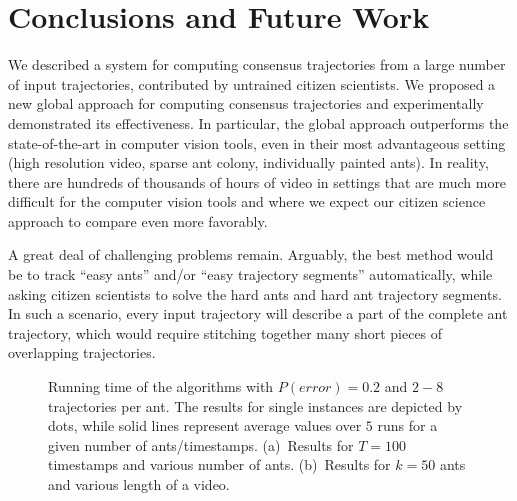 \documentclass{llncs}
\begin{document}
\section{Conclusions and Future Work}
\label{sect:open}
We described a system for computing consensus trajectories
from a large number of  input trajectories,
contributed by untrained citizen scientists.
We proposed a new global approach for computing consensus
trajectories and
experimentally demonstrated its effectiveness.
In particular, the global approach outperforms the state-of-the-art in
computer vision tools, even in their most advantageous setting (high
resolution video, sparse ant colony, individually painted ants).
In reality, there are hundreds of thousands of hours of video in settings
that are much more difficult for the computer vision tools and where
we expect our citizen science approach to compare even more
favorably.


A great deal of challenging problems remain. Arguably, the best method
would be to track ``easy ants'' and/or ``easy trajectory segments''
automatically, while asking citizen scientists to solve the hard ants
and hard ant trajectory segments. In such a scenario, every input
trajectory will describe a part of the complete ant trajectory, which
would require stitching together many short
pieces of overlapping trajectories.

\begin{figure}[t]
    \center
\hfill
    \caption{Running time of the algorithms with $P(error)=0.2$ and $2-8$ trajectories per ant.
    The results for single instances are depicted by dots, while solid lines represent average values over $5$ runs
    for a given number of ants/timestamps.
    (a)~Results for $T=100$ timestamps and various number of ants.
    (b)~Results for $k=50$ ants and various length of a video.}
    \label{fig:generated-runtime}
\end{figure}
\end{document}
